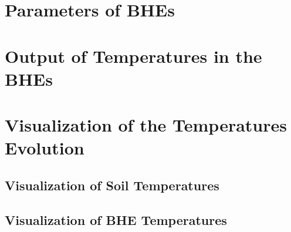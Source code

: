 \section{Parameters of BHEs}



\section{Output of Temperatures in the BHEs}
\label{sec:temp_output}


\section{Visualization of the Temperatures Evolution}

\subsection{Visualization of Soil Temperatures}

\subsection{Visualization of BHE Temperatures}


